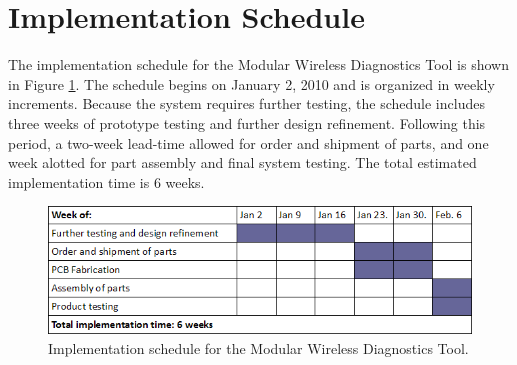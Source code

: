 \section[Implementation]{Implementation Schedule}
The implementation schedule for the Modular Wireless Diagnostics Tool is shown
in Figure \ref{fig:implement sched}. The schedule begins on January 2, 2010 and 
is organized in weekly increments. Because the system requires further testing,
the schedule includes three weeks of prototype testing and further design refinement.
Following this period, a two-week lead-time allowed for order and shipment of parts, 
and one week alotted for part assembly and final system testing. The total estimated
implementation time is 6 weeks.


\begin{figure}[bhp]
\begin{center}
\includegraphics[scale=0.55]{../drawings/implement_sched.png}
\end{center}
\caption[Implementation Schedule]{Implementation schedule for the Modular Wireless
Diagnostics Tool.}
\label{fig:implement sched}
\end{figure}

